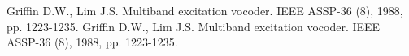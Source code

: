 \begin{thebibliography}{1}
 Griffin D.W., Lim J.S. \flqq Multiband excitation vocoder\frqq. IEEE ASSP-36 (8), 1988, pp. 1223-1235.
 Griffin D.W., Lim J.S. \flqq Multiband excitation vocoder\frqq. IEEE ASSP-36 (8), 1988, pp. 1223-1235.
\end{thebibliography}
